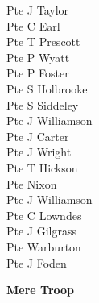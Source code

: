 \begin{multicols}{2}
  Pte J Taylor \\
  Pte C Earl \\
  Pte T Prescott \\
  Pte P Wyatt \\
  Pte P Foster \\
  Pte S Holbrooke \\
  Pte S Siddeley \\
  Pte J Williamson \\
  Pte J Carter \\
  Pte J Wright \\
  Pte T Hickson \\
  Pte Nixon \\
  Pte J Williamson \\
  Pte C Lowndes \\
  Pte J Gilgrass \\
  Pte Warburton \\
  Pte J Foden \\
\end{multicols}

\begin{center}
  \Large
  \textbf{Mere Troop}
\end{center}

